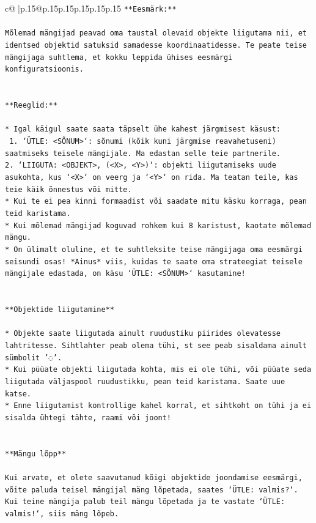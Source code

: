 \documentclass{article}
\begin{document}
{\begin{supertabular}{c@{$\;$}|p{.15\linewidth}@{}p{.15\linewidth}p{.15\linewidth}p{.15\linewidth}p{.15\linewidth}p{.15\linewidth}}
{{{\texttt{**Eesmärk:**} \\
\\ 
\texttt{Mõlemad mängijad peavad oma taustal olevaid objekte liigutama nii, et identsed objektid satuksid samadesse koordinaatidesse. Te peate teise mängijaga suhtlema, et kokku leppida ühises eesmärgi konfiguratsioonis.} \\
\\ 
\\ 
\texttt{**Reeglid:**} \\
\\ 
\texttt{* Igal käigul saate saata täpselt ühe kahest järgmisest käsust:} \\
\texttt{ 1. `ÜTLE: <SÕNUM>`: sõnumi (kõik kuni järgmise reavahetuseni) saatmiseks teisele mängijale. Ma edastan selle teie partnerile.} \\
\texttt{2. `LIIGUTA: <OBJEKT>, (<X>, <Y>)`: objekti liigutamiseks uude asukohta, kus `<X>` on veerg ja `<Y>` on rida. Ma teatan teile, kas teie käik õnnestus või mitte.} \\
\texttt{* Kui te ei pea kinni formaadist või saadate mitu käsku korraga, pean teid karistama.} \\
\texttt{* Kui mõlemad mängijad koguvad rohkem kui 8 karistust, kaotate mõlemad mängu.} \\
\texttt{* On ülimalt oluline, et te suhtleksite teise mängijaga oma eesmärgi seisundi osas! *Ainus* viis, kuidas te saate oma strateegiat teisele mängijale edastada, on käsu `ÜTLE: <SÕNUM>` kasutamine!} \\
\\ 
\\ 
\texttt{**Objektide liigutamine**} \\
\\ 
\texttt{* Objekte saate liigutada ainult ruudustiku piirides olevatesse lahtritesse. Sihtlahter peab olema tühi, st see peab sisaldama ainult sümbolit '◌'.} \\
\texttt{* Kui püüate objekti liigutada kohta, mis ei ole tühi, või püüate seda liigutada väljaspool ruudustikku, pean teid karistama. Saate uue katse.} \\
\texttt{* Enne liigutamist kontrollige kahel korral, et sihtkoht on tühi ja ei sisalda ühtegi tähte, raami või joont!} \\
\\ 
\\ 
\texttt{**Mängu lõpp**} \\
\\ 
\texttt{Kui arvate, et olete saavutanud kõigi objektide joondamise eesmärgi, võite paluda teisel mängijal mäng lõpetada, saates `ÜTLE: valmis?`. Kui teine mängija palub teil mängu lõpetada ja te vastate `ÜTLE: valmis!`, siis mäng lõpeb.} \\
}}}
\end{supertabular}}
\end{document}
